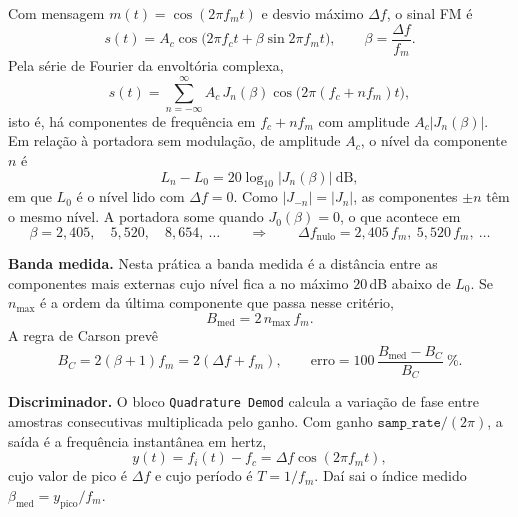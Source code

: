 \documentclass[11pt,a4paper]{article}
\begin{document}
Com mensagem $m(t)=\cos(2\pi f_m t)$ e desvio máximo $\Delta f$, o sinal FM é
\begin{equation}
  s(t) = A_c\cos\!\big(2\pi f_c t + \beta\sin 2\pi f_m t\big),
  \qquad \beta = \frac{\Delta f}{f_m}.
  \label{eq:fm}
\end{equation}
Pela série de Fourier da envoltória complexa,
\begin{equation}
  s(t) = \sum_{n=-\infty}^{\infty} A_c\,J_n(\beta)\cos\!\big(2\pi(f_c+nf_m)t\big),
  \label{eq:bessel}
\end{equation}
isto é, há componentes de frequência em $f_c+nf_m$ com amplitude
$A_c|J_n(\beta)|$. Em relação à portadora sem modulação, de amplitude $A_c$,
o nível da componente $n$ é
\begin{equation}
  L_n - L_0 = 20\log_{10}|J_n(\beta)|\ \text{dB},
  \label{eq:nivel}
\end{equation}
em que $L_0$ é o nível lido com $\Delta f=0$. Como $|J_{-n}|=|J_n|$, as
componentes $\pm n$ têm o mesmo nível. A portadora some quando $J_0(\beta)=0$,
o que acontece em
\begin{equation}
  \beta = 2{,}405,\quad 5{,}520,\quad 8{,}654,\ \dots
  \qquad\Rightarrow\qquad \Delta f_{\text{nulo}} = 2{,}405\,f_m,\ 5{,}520\,f_m,\ \dots
  \label{eq:nulos}
\end{equation}

\textbf{Banda medida.} Nesta prática a banda medida é a distância entre as
componentes mais externas cujo nível fica a no máximo $20$\,dB abaixo de
$L_0$. Se $n_{\max}$ é a ordem da última componente que passa nesse critério,
\begin{equation}
  B_{\text{med}} = 2\,n_{\max}\,f_m .
  \label{eq:bmed}
\end{equation}
A regra de Carson prevê
\begin{equation}
  B_C = 2(\beta+1)f_m = 2(\Delta f + f_m),
  \qquad
  \text{erro} = 100\,\frac{B_{\text{med}}-B_C}{B_C}\ \%.
  \label{eq:carson}
\end{equation}

\textbf{Discriminador.} O bloco \texttt{Quadrature Demod} calcula a variação de
fase entre amostras consecutivas multiplicada pelo ganho. Com ganho
$\texttt{samp\_rate}/(2\pi)$, a saída é a frequência instantânea em hertz,
\begin{equation}
  y(t) = f_i(t) - f_c = \Delta f\cos(2\pi f_m t),
  \label{eq:disc}
\end{equation}
cujo valor de pico é $\Delta f$ e cujo período é $T = 1/f_m$. Daí sai o índice
medido $\beta_{\text{med}} = y_{\text{pico}}/f_m$.
\end{document}
